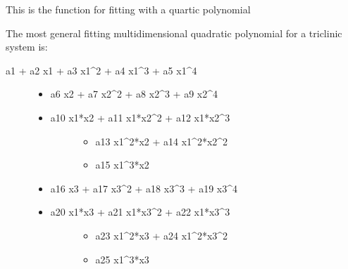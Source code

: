 \documentclass[letterpaper,10pt,english]{sphinxmanual}
\begin{document}
\begin{fulllineitems}
\label{pyqha:pyqha.fitutils.fit_quartic}
This is the function for fitting with a quartic polynomial

The most general fitting multidimensional quadratic polynomial for a triclinic
system is:
\begin{description}
\item[{a1 + a2  x1 + a3  x1\textasciicircum{}2 + a4  x1\textasciicircum{}3 + a5 x1\textasciicircum{}4        }] \leavevmode\begin{itemize}
\item {} 
a6  x2 + a7  x2\textasciicircum{}2 + a8  x2\textasciicircum{}3 + a9 x2\textasciicircum{}4

\item {} \begin{description}
\item[{a10 x1*x2 + a11 x1*x2\textasciicircum{}2 + a12  x1*x2\textasciicircum{}3}] \leavevmode\begin{itemize}
\item {} 
a13 x1\textasciicircum{}2*x2 + a14  x1\textasciicircum{}2*x2\textasciicircum{}2

\item {} 
a15 x1\textasciicircum{}3*x2

\end{itemize}

\end{description}

\item {} 
a16 x3 + a17 x3\textasciicircum{}2 + a18 x3\textasciicircum{}3 + a19 x3\textasciicircum{}4

\item {} \begin{description}
\item[{a20 x1*x3 + a21 x1*x3\textasciicircum{}2 + a22  x1*x3\textasciicircum{}3}] \leavevmode\begin{itemize}
\item {} 
a23 x1\textasciicircum{}2*x3 + a24  x1\textasciicircum{}2*x3\textasciicircum{}2

\item {} 
a25 x1\textasciicircum{}3*x3

\end{itemize}

\end{description}


\end{itemize}
\end{description}
\end{fulllineitems}
\end{document}
